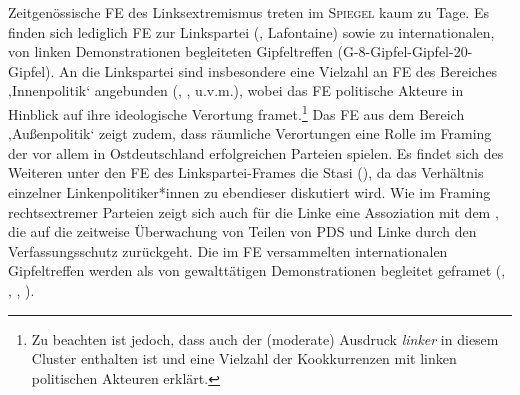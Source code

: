 Zeitgenössische FE des Linksextremismus treten im \textsc{Spiegel} kaum zu Tage. Es finden sich lediglich FE zur Linkspartei (, Lafontaine) sowie zu internationalen, von linken Demonstrationen begleiteten Gipfeltreffen (G-8-Gipfel-Gipfel-20-Gipfel). An die Linkspartei sind insbesondere eine Vielzahl an FE des Bereiches ‚Innenpolitik` angebunden (, ,  u.v.m.), wobei das FE  politische Akteure in Hinblick auf ihre ideologische Verortung framet.\footnote{Zu beachten ist jedoch, dass auch der (moderate) Ausdruck \emph{linker} in diesem Cluster enthalten ist und eine Vielzahl der Kookkurrenzen mit linken politischen Akteuren erklärt.} Das FE  aus dem Bereich ‚Außenpolitik` zeigt zudem, dass räumliche Verortungen eine Rolle im Framing der vor allem in Ostdeutschland erfolgreichen Parteien spielen. Es findet sich des Weiteren unter den FE des Linkspartei-Frames die Stasi (), da das Verhältnis einzelner Linkenpolitiker*innen zu ebendieser diskutiert wird. Wie im Framing rechtsextremer Parteien zeigt sich auch für die Linke eine Assoziation mit dem , die auf die zeitweise Überwachung von Teilen von PDS und Linke durch den Verfassungsschutz zurückgeht. Die im FE  versammelten internationalen Gipfeltreffen werden als von gewalttätigen Demonstrationen begleitet geframet (, , , ).

